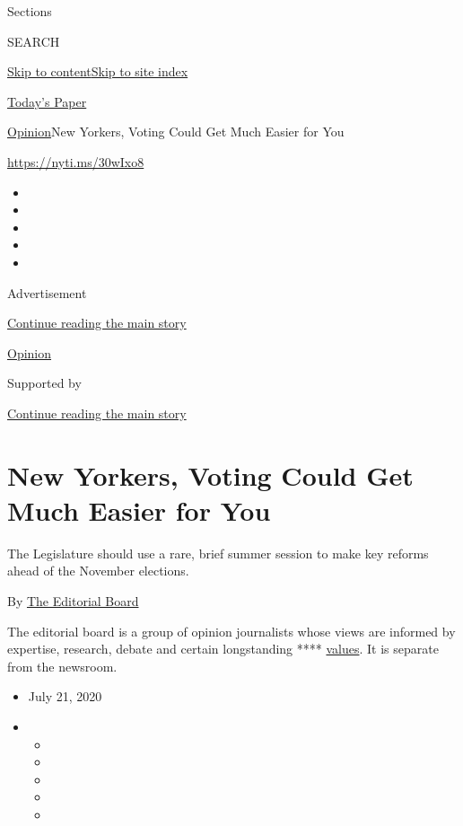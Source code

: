 Sections

SEARCH

\protect\hyperlink{site-content}{Skip to
content}\protect\hyperlink{site-index}{Skip to site index}

\href{https://myaccount.nytimes3xbfgragh.onion/auth/login?response_type=cookie\&client_id=vi}{}

\href{https://www.nytimes3xbfgragh.onion/section/todayspaper}{Today's
Paper}

\href{/section/opinion}{Opinion}\textbar{}New Yorkers, Voting Could Get
Much Easier for You

\url{https://nyti.ms/30wIxo8}

\begin{itemize}
\item
\item
\item
\item
\item
\end{itemize}

Advertisement

\protect\hyperlink{after-top}{Continue reading the main story}

\href{/section/opinion}{Opinion}

Supported by

\protect\hyperlink{after-sponsor}{Continue reading the main story}

\hypertarget{new-yorkers-voting-could-get-much-easier-for-you}{%
\section{New Yorkers, Voting Could Get Much Easier for
You}\label{new-yorkers-voting-could-get-much-easier-for-you}}

The Legislature should use a rare, brief summer session to make key
reforms ahead of the November elections.

By
\href{https://www.nytimes3xbfgragh.onion/interactive/opinion/editorialboard.html}{The
Editorial Board}

The editorial board is a group of opinion journalists whose views are
informed by expertise, research, debate and certain longstanding ****
\href{https://www.nytimes3xbfgragh.onion/interactive/2018/opinion/editorialboard.html}{values}.
It is separate from the newsroom.

\begin{itemize}
\item
  July 21, 2020
\item
  \begin{itemize}
  \item
  \item
  \item
  \item
  \item
  \end{itemize}
\end{itemize}

